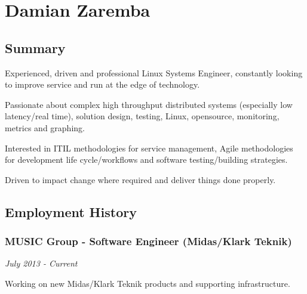 \section{Damian Zaremba}

\subsection{Summary}

Experienced, driven and professional Linux Systems Engineer, constantly
looking to improve service and run at the edge of technology.

Passionate about complex high throughput distributed systems (especially
low latency/real time), solution design, testing, Linux, opensource,
monitoring, metrics and graphing.

Interested in ITIL methodologies for service management, Agile
methodologies for development life cycle/workflows and software
testing/building strategies.

Driven to impact change where required and deliver things done properly.

\subsection{Employment History}

\subsubsection{MUSIC Group - Software Engineer (Midas/Klark Teknik)}

\emph{July 2013 - Current}

Working on new Midas/Klark Teknik products and supporting
infrastructure.

